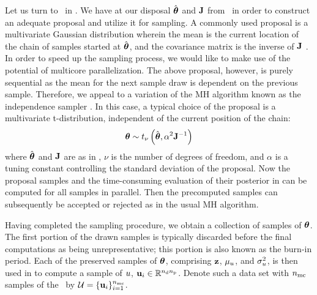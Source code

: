 Let us turn to \ in .
We have at our disposal $\hat{{\boldsymbol\theta}}$ and $\mathbf{J}$ from \ in order to construct an adequate proposal and utilize it for sampling.
A commonly used proposal is a multivariate Gaussian distribution wherein the mean is the current location of the chain of samples started at $\hat{{\boldsymbol\theta}}$, and the covariance matrix is the inverse of $\mathbf{J}$ \cite{gelman2004}.
In order to speed up the sampling process, we would like to make use of the potential of multicore parallelization.
The above proposal, however, is purely sequential as the mean for the next sample draw is dependent on the previous sample.
Therefore, we appeal to a variation of the MH algorithm known as the independence sampler \cite{gelman2004}.
In this case, a typical choice of the proposal is a multivariate t-distribution, independent of the current position of the chain:
\begin{equation} \elabel{proposal}
  \vparam \sim \studentst{\nu}{\hat{\vparam}}{\alpha^2 \mOI^{-1}}
\end{equation}
where $\hat{{\boldsymbol\theta}}$ and $\mathbf{J}$ are as in , $\nu$ is the number of degrees of freedom, and $\alpha$ is a tuning constant controlling the standard deviation of the proposal.
Now the proposal samples and the time-consuming evaluation of their posterior in  can be computed for all samples in parallel.
Then the precomputed samples can subsequently be accepted or rejected as in the usual MH algorithm.

Having completed the sampling procedure, we obtain a collection of samples of ${\boldsymbol\theta}$. The first portion of the drawn samples is typically discarded before the final computations as being unrepresentative; this portion is also known as the burn-in period.
Each of the preserved samples of ${\boldsymbol\theta}$, comprising $\mathbf{z}$, $\mu_u$, and $\sigma^2_u$, is then used in  to compute a sample of $u$, $\mathbf{u}_i \in \mathbb{R}^{{n_\text{d}} {n_\text{p}}}$.
Denote such a data set with ${n_\text{mc}}$ samples of the \qoi\ by $\mathcal{U} = \{ \mathbf{u}_i \}_{i = 1}^{n_\text{mc}}$.
